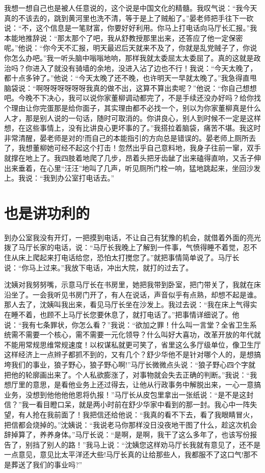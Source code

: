 \documentclass[12pt,oneside]{book}
\begin{document}
我想一想自己也是被人任意说的，这个说是中国文化的精髓。我叹气说：``我今天真的不该去的，跳到黄河里也洗不清，等于是上了贼船了。''晏老师把手往下一砍说：``不，这个信息是一笔财富，你要好好利用。你马上打电话向马厅长汇报。''我本能地推辞说：``那太那个了吧，我从舒教授那里出来，还答应了他一定保密呢。''他说：``你今天不汇报，明天最迟后天就来不及了，你就是乱党贼子了，你说你怎么办吧。''我一听头脑中嗡嗡地响，那样我就太委屈太太委屈了。真的这就是政治吗？你进入了就没有骑墙的余地，没进入沾了边也不行！我说：``今天太晚了，都十点多钟了。''他说：``今天太晚了还不晚，也许明天一早就太晚了。''我急得直甩脑袋说：``啊呀呀呀呀呀呀我真的做不出，这算不算出卖呢？''他说：``你自己想想吧。今晚不下决心，我可以说你家董柳调动都完了，不是手续还没办好吗？给你找个理由让你完蛋那是给你面子，其实理由都不必找一个，别以为你家董柳真是什么人才，那是别人说的一句话，随时可取消的。你讲良心，别人到时候不一定是这样想，在这些事情上，没有比讲良心更坏事的了。''我搭拉着脑袋，痛苦不堪。我这时非常清醒，晏老师是对的!而自己的本能指引的方向总是错误的。晏老师上厕所去了，我想董柳她可经不起这个打击！忽然出乎自己意料地，我身子往前一窜，双手就撑在地上了。我四肢着地爬了几步，昂着头把牙齿龇了出来磕得直响，又舌子伸出来垂着，在心里``汪汪''地叫了几声，听见厕所门栓一响，猛地跳起来，坐回沙发上。我说：``我到办公室打电话去。''


\chapter{也是讲功利的}

到办公室我没有开灯，一把摸到电话，不让自己有犹豫的机会，就借着外面的亮光拨了马厅长家的电话，说：``马厅长我晚上了解到一件事，气愤得睡不着觉，忍不住从床上爬起来打电话给您，恐怕太打搅您了。''就把事情简单说了。马厅长说：``你马上过来。''我放下电话，冲出大院，就打的过去了。

沈姨对我努努嘴，示意马厅长在书房里，她把我带到卧室，把门带关了，我就在床沿坐了。一会我听见书房门开了，有人在说话，声音似乎有点熟，却想不起是谁。那人去了，沈姨叫我出来，看见马厅长坐在沙发上。我过去说：``我在床上气得实在睡不着，也顾不上马厅长您要休息了，就打电话了。''把事情详细说了。他说：``我有七条罪状，你怎么看？''我说：``欲加之罪！什么叫一言堂？全省卫生系统需不需要一个核心，需不需要一元化领导？什么叫好大喜功，改革开放的年代就不能用常规思维常规速度！以权谋私就更可笑了，省里这么多厅级单位，像卫生厅这样经济上一点辫子都抓不到的，又有几个？舒少华他不是针对哪个人的，是想搞垮我们的事业，狼子野心，狼子野心啊!''马厅长微微点头说：``狼子野心四个字就把他的轮廓画出来了。个人私欲膨涨了，对事物就会失去正确的判断。''我说：``我想厅里的意思，是看他业务上还过得去，让他从行政事务中解脱出来，一心一意搞业务，没想到他他他他恩将仇报！''马厅长从皮包里拿出一张纸说：``是不是这封信？''我一看目瞪口呆，就是两小时前在舒少华家中看到的那一封。我心中一阵失望，有人抢在我前面了！我把信还给他说：``我真的看不下去，看了我眼睛冒火，把信都会烧掉的。''沈姨说：``我说老马你那样没日没夜地干图了什么，趁这次机会辞掉算了，养养身体。''马厅长说：``是啊，是啊，我干了这么多年了，也该写份报告了，别挡了别人的路！''我马上说：``沈姨您这样劝马厅长我就有意见了，还不是一点意见，意见比太平洋还大些!马厅长真的让给那些人，我都服不了这口气!那不是葬送了我们的事业吗?''
\end{document}
